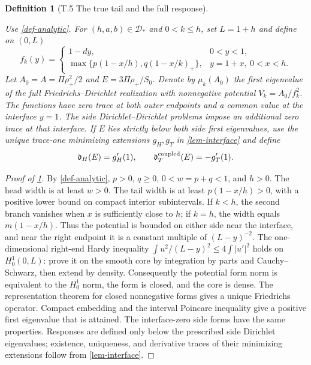 \documentclass[11pt,a4paper]{article}
\theoremstyle{proofmanuscript}
\newtheorem{definition}[theorem]{Definition}
\begin{document}
\begin{definition}[T.5 The true tail and the full response]\label{def-coupled-model}

Use \ref{def-analytic}. For \((h,a,b)\in\mathcal D_*\) and \(0<k\le h\), set \(L=1+h\) and define on \((0,L)\) \[
f_k(y)=\begin{cases}1-dy,&0<y<1,\\
\max\{p(1-x/h),q(1-x/k)_+\},&y=1+x,\ 0<x<h.
\end{cases}
\] Let \(A_0=A=\Pi\rho_+^2/2\) and \(E=3\Pi\rho_+/S_0\). Denote by \(\mu_k(A_0)\) the first eigenvalue of the full Friedrichs--Dirichlet realization with nonnegative potential \(V_k=A_0/f_k^2\). The functions have zero trace at both outer endpoints and a common value at the interface \(y=1\). The side Dirichlet--Dirichlet problems impose an additional zero trace at that interface. If \(E\) lies strictly below both side first eigenvalues, use the unique trace-one minimizing extensions \(g_H,g_T\) in \ref{lem-interface} and define \[
\mathfrak d_H(E)=g_H'(1),\qquad
\mathfrak d_T^{\rm coupled}(E)=-g_T'(1).
\]

\end{definition}

\begin{proof}[Proof of \ref{def-coupled-model}]

By \ref{def-analytic}, \(p>0\), \(q\ge0\), \(0<w=p+q<1\), and \(h>0\). The head width is at least \(w>0\). The tail width is at least \(p(1-x/h)>0\), with a positive lower bound on compact interior subintervals. If \(k<h\), the second branch vanishes when \(x\) is sufficiently close to \(h\); if \(k=h\), the width equals \(m(1-x/h)\). Thus the potential is bounded on either side near the interface, and near the right endpoint it is a constant multiple of \((L-y)^{-2}\). The one-dimensional right-end Hardy inequality \(\int u^2/(L-y)^2\le4\int|u'|^2\) holds on \(H_0^1(0,L)\): prove it on the smooth core by integration by parts and Cauchy--Schwarz, then extend by density. Consequently the potential form norm is equivalent to the \(H_0^1\) norm, the form is closed, and the core is dense. The representation theorem for closed nonnegative forms gives a unique Friedrichs operator. Compact embedding and the interval Poincare inequality give a positive first eigenvalue that is attained. The interface-zero side forms have the same properties. Responses are defined only below the prescribed side Dirichlet eigenvalues; existence, uniqueness, and derivative traces of their minimizing extensions follow from \ref{lem-interface}.

\end{proof}
\end{document}
